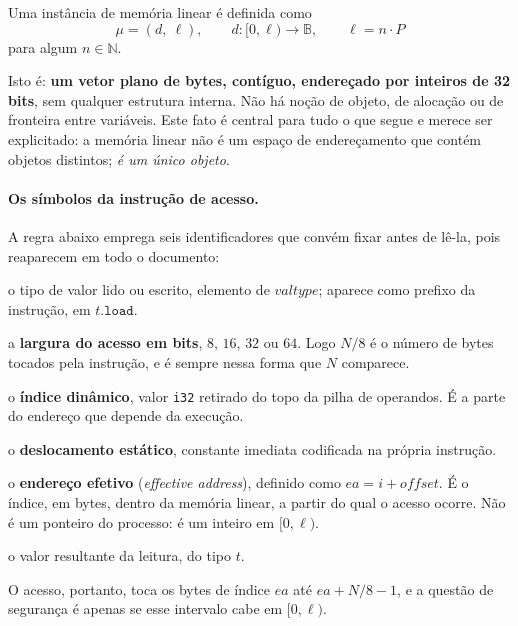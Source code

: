 \documentclass[11pt,a4paper]{article}
\theoremstyle{definition}
\newcommand{\code}[1]{\texttt{#1}}
\begin{document}
Uma instância de memória linear é definida como
\[
  \mu = (d,\ \ell), \qquad d : [0,\ell) \to \mathbb{B}, \qquad \ell = n \cdot P
\]
para algum $n \in \mathbb{N}$.

Isto é: \textbf{um vetor plano de bytes, contíguo,
endereçado por inteiros de 32 bits}, sem qualquer estrutura interna. Não há
noção de objeto, de alocação ou de fronteira entre variáveis. Este fato é
central para tudo o que segue e merece ser explicitado: a memória linear não é
um espaço de endereçamento que contém objetos distintos; \emph{é um único
objeto}.

\paragraph{Os símbolos da instrução de acesso.}
A regra abaixo emprega seis identificadores que convém fixar antes de lê-la, pois
reaparecem em todo o documento:

\begin{description}[leftmargin=4.2em,style=nextline,font=\normalfont\itshape]
  \item[$t$] o tipo de valor lido ou escrito, elemento de $\mathit{valtype}$;
             aparece como prefixo da instrução, em $t.\mathtt{load}$.
  \item[$N$] a \textbf{largura do acesso em bits}, $8$, $16$, $32$ ou $64$.
             Logo $N/8$ é o número de bytes tocados pela instrução, e é sempre
             nessa forma que $N$ comparece.
  \item[$i$] o \textbf{índice dinâmico}, valor \code{i32} retirado do topo da
             pilha de operandos. É a parte do endereço que depende da execução.
  \item[$\mathit{offset}$] o \textbf{deslocamento estático}, constante imediata
             codificada na própria instrução.
  \item[$ea$] o \textbf{endereço efetivo} (\emph{effective address}), definido
             como $ea = i + \mathit{offset}$. É o índice, em bytes, dentro da
             memória linear, a partir do qual o acesso ocorre. Não é um ponteiro
             do processo: é um inteiro em $[0,\ell)$.
  \item[$c$] o valor resultante da leitura, do tipo $t$.
\end{description}

\noindent
O acesso, portanto, toca os bytes de índice $ea$ até $ea + N/8 - 1$, e a questão
de segurança é apenas se esse intervalo cabe em $[0,\ell)$.
\end{document}
